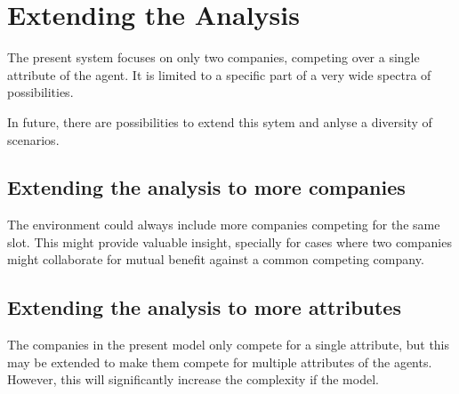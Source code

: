 
\chapter{Extending the Analysis} %

\label{Chapter6} %


The present system focuses on only two companies, competing over a single attribute of the agent. It is limited to a specific  part of a very wide spectra of possibilities.

In future, there are possibilities to extend this sytem and anlyse a diversity of scenarios.


\section{Extending the analysis to more companies}

The environment could always include more companies competing for the same slot. This might provide valuable insight, specially for cases where two companies might collaborate for mutual benefit against a common competing company.


\section{Extending the analysis to more attributes}

The companies in the present model only compete for a single attribute, but this may be extended to make them compete for multiple attributes of the  agents. However, this will significantly increase the complexity if the model.



